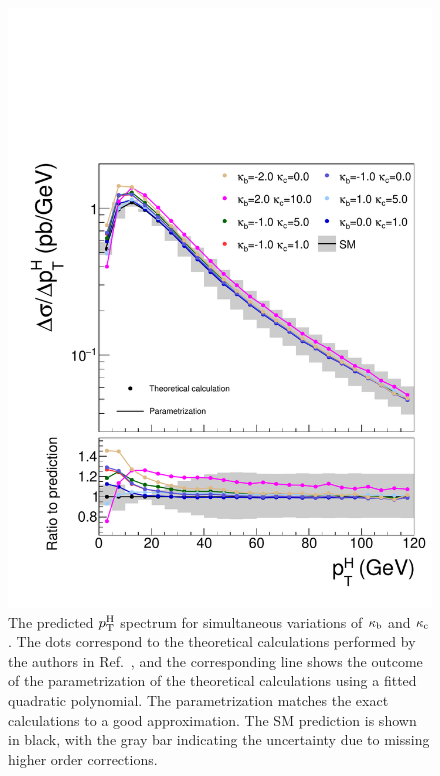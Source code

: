 \begin{figure}[hbtp]
  \begin{center}
    \includegraphics[width=\halflinewidth]{img/interpretation/other/varparcomp_kbkc.pdf}
    \caption{
        The predicted $p_\mathrm{T}^\mathrm{H}$ spectrum for simultaneous variations of $\kappa_{\mathrm{b}}$ and $\kappa_{\mathrm{c}}$.
        The dots correspond to the theoretical calculations performed by the authors in Ref.~\cite{Bishara:2016jga}, and the corresponding line shows the outcome of the parametrization of the theoretical calculations using a fitted quadratic polynomial.
        The parametrization matches the exact calculations to a good approximation.
        The SM prediction is shown in black, with the gray bar indicating the uncertainty due to missing higher order corrections.
        }
    \label{fig:theories_kbkc}
  \end{center}
\end{figure}



